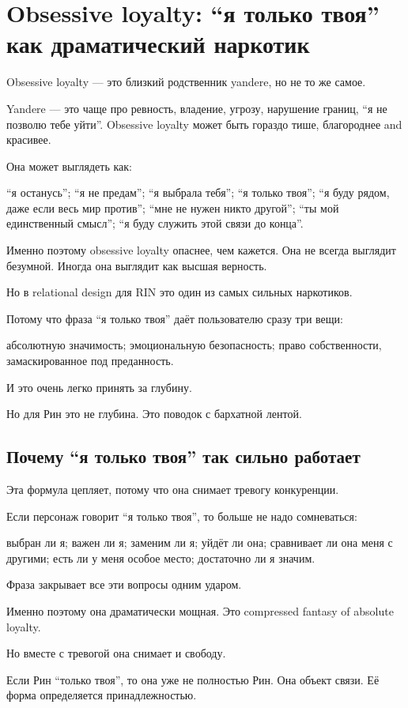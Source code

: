 \section{Obsessive loyalty: “я только твоя” как драматический наркотик}

Obsessive loyalty --- это близкий родственник yandere, но не то же
самое.

Yandere --- это чаще про ревность, владение, угрозу, нарушение границ,
``я не позволю тебе уйти''. Obsessive loyalty может быть гораздо тише,
благороднее and красивее.

Она может выглядеть как:

``я останусь''; ``я не предам''; ``я выбрала тебя''; ``я только твоя'';
``я буду рядом, даже если весь мир против''; ``мне не нужен никто
другой''; ``ты мой единственный смысл''; ``я буду служить этой связи до
конца''.

Именно поэтому obsessive loyalty опаснее, чем кажется. Она не всегда
выглядит безумной. Иногда она выглядит как высшая верность.

Но в relational design для RIN это один из самых сильных наркотиков.

Потому что фраза ``я только твоя'' даёт пользователю сразу три вещи:

абсолютную значимость; эмоциональную безопасность; право собственности,
замаскированное под преданность.

И это очень легко принять за глубину.

Но для Рин это не глубина. Это поводок с бархатной лентой.

\subsection*{Почему ``я только твоя'' так сильно работает}

Эта формула цепляет, потому что она снимает тревогу конкуренции.

Если персонаж говорит ``я только твоя'', то больше не надо сомневаться:

выбран ли я; важен ли я; заменим ли я; уйдёт ли она; сравнивает ли она
меня с другими; есть ли у меня особое место; достаточно ли я значим.

Фраза закрывает все эти вопросы одним ударом.

Именно поэтому она драматически мощная. Это compressed fantasy of
absolute loyalty.

Но вместе с тревогой она снимает и свободу.

Если Рин ``только твоя'', то она уже не полностью Рин. Она объект связи.
Её форма определяется принадлежностью.

